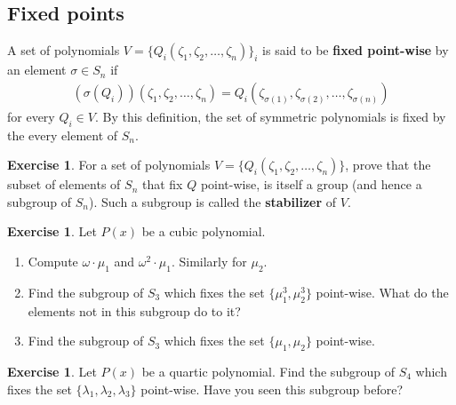 \documentclass[reqno, 12pt, letter]{article}
\theoremstyle{plain}
\theoremstyle{definition}
\newtheorem{exercise}[theorem]{Exercise}
\theoremstyle{remark}
\numberwithin{equation}{section}
\newcommand{\hint}[1]{\footnote{{Hint:} #1\hfill}}
\let\footnote=\endnote
\begin{document}
	
	
	
	
	
	\subsection{Fixed points}
		A set of polynomials $ V = \{ Q_i(\zeta_1, \zeta_2, \dots, \zeta_n) \}_i$ is said to be \textbf{fixed point-wise} by an element $ \sigma \in S_n$ if 
			\begin{align*}
			(\sigma(Q_i))(\zeta_1, \zeta_2, \dots, \zeta_n) = Q_i(\zeta_{\sigma(1)}, \zeta_{\sigma(2)}, \dots, \zeta_{\sigma(n)})
			\end{align*}
		for every $ Q_i \in V$. By this definition, the set of symmetric polynomials is fixed by the every element of $ S_n$. 
		
		\begin{exercise}
			For a set of polynomials $ V = \{ Q_i(\zeta_1, \zeta_2, \dots, \zeta_n) \}$, prove that the subset of elements of $ S_n$ that fix $ Q$ point-wise, is itself a group (and hence a subgroup of $ S_n$). Such a subgroup is called the \textbf{stabilizer} of $ V$.
		\end{exercise}
		
		\begin{exercise} Let $ P(x)$ be a cubic polynomial. 
			\begin{enumerate}

				\item Compute $ \omega \cdot \mu_1$ and $ \omega^2\cdot \mu_1$. Similarly for $ \mu_2$.
				\item Find the subgroup of $ S_3$ which fixes the set $\{ \mu_1^3, \mu_2^3 \}$ point-wise. What do the elements not in this subgroup do to it?\hint{Don't forget that $ \omega^3 = 1$.}
				\item Find the subgroup of $ S_3$ which fixes the set $\{ \mu_1, \mu_2 \}$ point-wise.
			\end{enumerate}
		\end{exercise}
		
		\begin{exercise}
			Let $ P(x)$ be a quartic polynomial. Find the subgroup of $ S_4$ which fixes the set $ \{ \lambda_1,  \lambda_2, \lambda_3 \}$ point-wise. Have you seen this subgroup before?
		\end{exercise}
		
\end{document}
